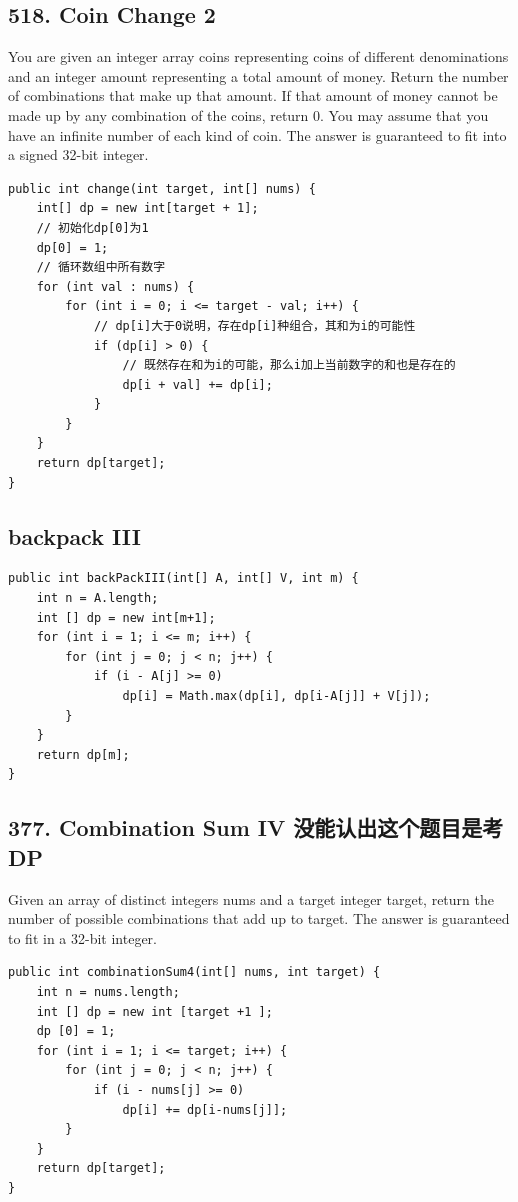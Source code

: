 \documentclass[9pt, b5paper]{article}
\begin{document}
\subsection{518. Coin Change 2}
\label{sec-4-11}
You are given an integer array coins representing coins of different denominations and an integer amount representing a total amount of money.
Return the number of combinations that make up that amount. If that amount of money cannot be made up by any combination of the coins, return 0.
You may assume that you have an infinite number of each kind of coin.
The answer is guaranteed to fit into a signed 32-bit integer.
\begin{verbatim}
public int change(int target, int[] nums) {
    int[] dp = new int[target + 1];
    // 初始化dp[0]为1
    dp[0] = 1;
    // 循环数组中所有数字
    for (int val : nums) {
        for (int i = 0; i <= target - val; i++) {
            // dp[i]大于0说明，存在dp[i]种组合，其和为i的可能性
            if (dp[i] > 0) {
                // 既然存在和为i的可能，那么i加上当前数字的和也是存在的
                dp[i + val] += dp[i];
            }
        }
    }
    return dp[target];
}
\end{verbatim}

\subsection{backpack III}
\label{sec-4-12}
\begin{verbatim}
public int backPackIII(int[] A, int[] V, int m) {
    int n = A.length;
    int [] dp = new int[m+1];
    for (int i = 1; i <= m; i++) {
        for (int j = 0; j < n; j++) {
            if (i - A[j] >= 0)
                dp[i] = Math.max(dp[i], dp[i-A[j]] + V[j]);
        }
    }
    return dp[m];
}
\end{verbatim}

\subsection{377. Combination Sum IV 没能认出这个题目是考DP}
\label{sec-4-13}
Given an array of distinct integers nums and a target integer target, return the number of possible combinations that add up to target.
The answer is guaranteed to fit in a 32-bit integer.
\begin{verbatim}
public int combinationSum4(int[] nums, int target) {
    int n = nums.length;
    int [] dp = new int [target +1 ];
    dp [0] = 1;
    for (int i = 1; i <= target; i++) {
        for (int j = 0; j < n; j++) {
            if (i - nums[j] >= 0)
                dp[i] += dp[i-nums[j]];
        }
    }
    return dp[target];
}
\end{verbatim}
\end{document}

